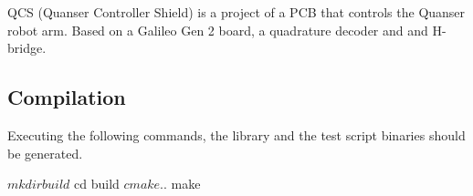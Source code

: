 Q\+CS (Quanser Controller Shield) is a project of a P\+CB that controls the Quanser robot arm. Based on a Galileo Gen 2 board, a quadrature decoder and and H-\/bridge.

\subsection*{Compilation}

Executing the following commands, the library and the test script binaries should be generated. \begin{DoxyVerb}$ mkdir build
$ cd build
$ cmake ..
$ make\end{DoxyVerb}
 